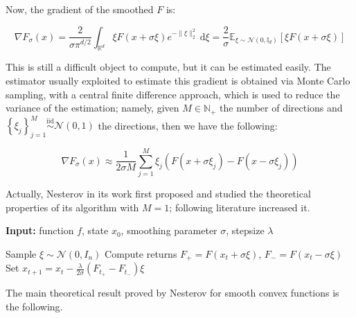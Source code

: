 Now, the gradient of the smoothed $F$ is:

\begin{equation}
    \nabla F_{\sigma}(x)=\frac{2}{\sigma \pi^{d / 2}} \int_{\mathbb{R}^{d}} \xi F(x+\sigma \xi) e^{-\|\xi\|_{2}^{2}} \mathrm{~d} \xi=\frac{2}{\sigma} \mathbb{E}_{\xi \sim \mathcal{N}\left(0, \mathbb{I}_{d}\right)}[\xi F(x+\sigma \xi)]
\end{equation}

This is still a difficult object to compute, but it can be estimated easily. The estimator usually exploited to estimate this gradient is obtained via Monte Carlo sampling, with a central finite difference approach, which is used to reduce the variance of the estimation; namely, given $M \in \mathbb{N}_+$ the number of directions and $\left\{\xi_{j}\right\}_{j=1}^{M} \stackrel{\mathrm{iid}}{\sim} \mathcal{N}(0,1)$ the directions, then we have the following:

\begin{defn}\label{GradientGaussianSmoothingDefn}

	\begin{equation}
	    \nabla F_{\sigma}(x) \approx \frac{1}{2\sigma M} \sum_{j=1}^{M} \xi_{j}\left(F\left(x+\sigma \xi_{j}\right)-F\left(x-\sigma \xi_{j}\right)\right)
	\end{equation}

\end{defn}

Actually, Nesterov in its work first proposed and studied the theoretical properties of its algorithm with $M=1$;
following literature increased it.

\begin{algorithm}[h]
\caption{Random Search}\label{NesterovAlgorithm}

\hspace*{\algorithmicindent} \textbf{Input:} function $f$, state $x_0$, smoothing parameter $\sigma$, stepsize $\lambda$
\begin{algorithmic}[1]

    \State Sample $\xi \sim \mathcal{N}(0,I_n)$
    \State Compute returns $F_{+} = F(x_t + \sigma\xi)$, $F_{-} = F(x_t - \sigma\xi)$
    \State Set $x_{t+1} = x_t - \frac{\lambda}{2\sigma} (F_{t_+} - F_{t_-})\xi$
\EndFor

\end{algorithmic}
\end{algorithm}

The main theoretical result proved by Nesterov for smooth convex functions is the following. 

